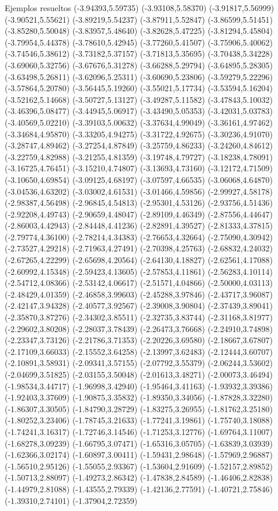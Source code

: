 \documentclass[11pt,a4paper]{article}
\begin{document}
\begin{fmex}{Ejemplos resueltos}
(-3.94393,5.59735) (-3.93108,5.58370) (-3.91817,5.56999) (-3.90521,5.55621) (-3.89219,5.54237) (-3.87911,5.52847) (-3.86599,5.51451) (-3.85280,5.50048) (-3.83957,5.48640) (-3.82628,5.47225) (-3.81294,5.45804) (-3.79954,5.44378) (-3.78610,5.42945) (-3.77260,5.41507) (-3.75906,5.40062) (-3.74546,5.38612) (-3.73182,5.37157) (-3.71813,5.35695) (-3.70438,5.34228) (-3.69060,5.32756) (-3.67676,5.31278) (-3.66288,5.29794) (-3.64895,5.28305) (-3.63498,5.26811) (-3.62096,5.25311) (-3.60690,5.23806) (-3.59279,5.22296) (-3.57864,5.20780) (-3.56445,5.19260) (-3.55021,5.17734) (-3.53594,5.16204) (-3.52162,5.14668) (-3.50727,5.13127) (-3.49287,5.11582) (-3.47843,5.10032) (-3.46396,5.08477) (-3.44945,5.06917) (-3.43490,5.05353) (-3.42031,5.03783) (-3.40569,5.02210) (-3.39103,5.00632) (-3.37634,4.99049) (-3.36161,4.97462) (-3.34684,4.95870) (-3.33205,4.94275) (-3.31722,4.92675) (-3.30236,4.91070) (-3.28747,4.89462) (-3.27254,4.87849) (-3.25759,4.86233) (-3.24260,4.84612) (-3.22759,4.82988) (-3.21255,4.81359) (-3.19748,4.79727) (-3.18238,4.78091) (-3.16725,4.76451) (-3.15210,4.74807) (-3.13693,4.73160) (-3.12172,4.71509) (-3.10650,4.69854) (-3.09125,4.68197) (-3.07597,4.66535) (-3.06068,4.64870) (-3.04536,4.63202) (-3.03002,4.61531) (-3.01466,4.59856) (-2.99927,4.58178) (-2.98387,4.56498) (-2.96845,4.54813) (-2.95301,4.53126) (-2.93756,4.51436) (-2.92208,4.49743) (-2.90659,4.48047) (-2.89109,4.46349) (-2.87556,4.44647) (-2.86003,4.42943) (-2.84448,4.41236) (-2.82891,4.39527) (-2.81333,4.37815) (-2.79774,4.36100) (-2.78214,4.34383) (-2.76653,4.32664) (-2.75090,4.30942) (-2.73527,4.29218) (-2.71963,4.27491) (-2.70398,4.25763) (-2.68832,4.24032) (-2.67265,4.22299) (-2.65698,4.20564) (-2.64130,4.18827) (-2.62561,4.17088) (-2.60992,4.15348) (-2.59423,4.13605) (-2.57853,4.11861) (-2.56283,4.10114) (-2.54712,4.08366) (-2.53142,4.06617) (-2.51571,4.04866) (-2.50000,4.03113) (-2.48429,4.01359) (-2.46858,3.99603) (-2.45288,3.97846) (-2.43717,3.96087) (-2.42147,3.94328) (-2.40577,3.92567) (-2.39008,3.90804) (-2.37439,3.89041) (-2.35870,3.87276) (-2.34302,3.85511) (-2.32735,3.83744) (-2.31168,3.81977) (-2.29602,3.80208) (-2.28037,3.78439) (-2.26473,3.76668) (-2.24910,3.74898) (-2.23347,3.73126) (-2.21786,3.71353) (-2.20226,3.69580) (-2.18667,3.67807) (-2.17109,3.66033) (-2.15552,3.64258) (-2.13997,3.62483) (-2.12444,3.60707) (-2.10891,3.58931) (-2.09341,3.57155) (-2.07792,3.55379) (-2.06244,3.53602) (-2.04699,3.51825) (-2.03155,3.50048) (-2.01613,3.48271) (-2.00073,3.46494) (-1.98534,3.44717) (-1.96998,3.42940) (-1.95464,3.41163) (-1.93932,3.39386) (-1.92403,3.37609) (-1.90875,3.35832) (-1.89350,3.34056) (-1.87828,3.32280) (-1.86307,3.30505) (-1.84790,3.28729) (-1.83275,3.26955) (-1.81762,3.25180) (-1.80252,3.23406) (-1.78745,3.21633) (-1.77241,3.19861) (-1.75740,3.18088) (-1.74241,3.16317) (-1.72746,3.14546) (-1.71253,3.12776) (-1.69764,3.11007) (-1.68278,3.09239) (-1.66795,3.07471) (-1.65316,3.05705) (-1.63839,3.03939) (-1.62366,3.02174) (-1.60897,3.00411) (-1.59431,2.98648) (-1.57969,2.96887) (-1.56510,2.95126) (-1.55055,2.93367) (-1.53604,2.91609) (-1.52157,2.89852) (-1.50713,2.88097) (-1.49273,2.86342) (-1.47838,2.84589) (-1.46406,2.82838) (-1.44979,2.81088) (-1.43555,2.79339) (-1.42136,2.77591) (-1.40721,2.75846) (-1.39310,2.74101) (-1.37904,2.72359) 
\end{fmex}
\end{document}
